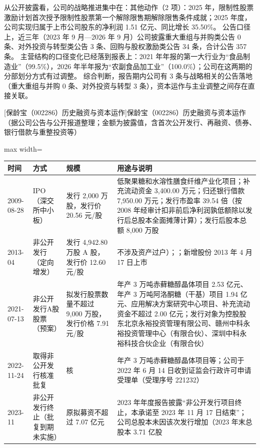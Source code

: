  从公开披露看，公司的战略推进集中在：其他动作（2 项）：2025 年，限制性股票激励计划首次授予限制性股票第一个解除限售期解除限售条件成就；2025 年度，公司实现归属于上市公司股东的净利润 1.51 亿元、同比增长 35.50\%。 公告口径上，近三年（2023 年 9 月---2026 年 9 月）公司披露重大重组与并购类公告 0 条、对外投资与转型类公告 3 条、回购与股权激励类公告 34 条，合计公告 357 条。 主营结构的口径变化已经落到报表上：2021 年年报的第一大行业为“食品制造业”（99.5\%），2026 年半年报为“农副食品加工业”（100.0\%）；公司在这两期的分部划分方式有过调整。 综合判断，报告期内公司有 3 条与战略相关的公告落地（重大重组与并购 0 条、对外投资与转型 3 条），资本运作与主业调整之间存在直接关联。

\begin{center}\small\setlength{\tabcolsep}{4pt}
[保龄宝（002286）历史融资与资本运作]{保龄宝（002286）历史融资与资本运作（据公司公告与公开报道整理；金额为披露值，含首次公开发行、再融资、债券、银行借款与重整投资等）}
\begin{adjustbox}{max width=\textwidth}
\begin{tabular}{@{}p{1.45cm}p{2.55cm}p{4.05cm}p{4.95cm}@{}}
\toprule
时间 & 方式 & 规模 & 用途与说明 \\
\midrule
2009-08-28 & IPO（深交所中小板） & 发行 2,\allowbreak{}000 万股，\allowbreak{}发行价 20.56 元/\allowbreak{}股 & 低聚果糖和水溶性膳食纤维产业化项目；补充流动资金 3,\allowbreak{}400.00 万元；归还银行借款 7,\allowbreak{}950.00 万元；发行市盈率 39.54 倍（按 2008 年经审计扣非前后净利润孰低额除以发行后总股本全面摊薄计算）；发行后股本总额 8,\allowbreak{}000 万股 \\
2013-04 & 非公开发行（定向增发） & 发行 4,\allowbreak{}942.80 万股 A 股，\allowbreak{}发行价 12.60 元/\allowbreak{}股 & 不涉及资产过户）；；新增股份 2013 年 4 月 17 日上市 \\
2021-07-13 & 非公开发行A股股票（预案） & 拟发行股票数量不超过 9,\allowbreak{}000 万股，\allowbreak{}发行价格 7.91 元/\allowbreak{}股 & 年产 3 万吨赤藓糖醇晶体项目 2.53 亿元、\allowbreak{}年产 3 万吨阿洛酮糖（干基）项目 1.94 亿元、\allowbreak{}应用解决方案研究中心项目、\allowbreak{}补充流动资金不超过 2.00 亿元；发行对象为控股股东北京永裕投资管理有限公司、\allowbreak{}赣州中科永裕投资管理中心（有限合伙）、\allowbreak{}深圳中科永裕科技合伙企业（有限合伙） \\
2022-11-24 & 取得非公开发行核准批复 & 核 & 年产 3 万吨赤藓糖醇晶体项目等；公司于 2022 年 6 月 14 日收到证监会行政许可申请受理单（受理序号 221232） \\
2023-11 & 非公开发行终止（批复到期未实施） & 原拟募资不超过 7.07 亿元 & 2023 年年度报告披露“非公开发行项目终止，\allowbreak{}本承诺至 2023 年 11 月 17 日结束”；公司总股本未因该次发行增加（2023 年末总股本 3.71 亿股 \\
\bottomrule
\end{tabular}
\end{adjustbox}
\end{center}

